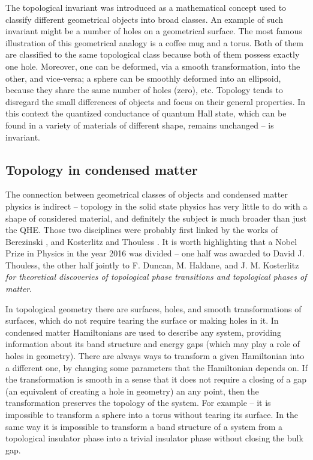 \documentclass[titlepage,a4paper]{book}
\newcommand{\wciecie}{\quad\phantom{v}}
\begin{document}
The topological invariant was introduced as a mathematical concept used to classify different geometrical objects into broad classes. An example of such invariant might be a number of holes on a geometrical surface. The most famous illustration of this geometrical analogy is a coffee mug and a torus. Both of them are classified to the same topological class because both of them possess exactly one hole. Moreover, one can be deformed, via a smooth transformation, into the other, and vice-versa; a sphere can be smoothly deformed into an ellipsoid, because they share the same number of holes (zero), etc. Topology tends to disregard the small differences of objects and focus on their general properties. In this context the quantized conductance of quantum Hall state, which can be found in a variety of materials of different shape, remains unchanged -- is invariant. 
 
\subsection{Topology in condensed matter}
\wciecie
The connection between geometrical classes of objects and condensed matter physics is indirect -- topology in the solid state physics has very little to do with a shape of considered material, and definitely the subject is much broader than just the QHE. Those two disciplines were probably first linked by the works of Berezinski \cite{Berezinski1}\cite{Berezinski2}, and Kosterlitz and Thouless \cite{Thouless_nobel}. It is worth highlighting that a Nobel Prize in Physics in the year 2016 was divided -- one half was awarded to David J. Thouless, the other half jointly to F. Duncan, M. Haldane, and J. M. Kosterlitz \textit{for theoretical discoveries of topological phase transitions and topological phases of matter}.

In topological geometry there are surfaces, holes, and smooth transformations of surfaces, which do not require tearing the surface or making holes in it. In condensed matter Hamiltonians are used to describe any system, providing information about its band structure and energy gaps (which may play a role of holes in geometry). There are always ways to transform a given Hamiltonian into a different one, by changing some parameters that the Hamiltonian depends on. If the transformation is smooth in a sense that it does not require a closing of a gap (an equivalent of creating a hole in geometry) an any point, then the transformation preserves the topology of the system. For example -- it is impossible to transform a sphere into a torus without tearing its surface. In the same way it is impossible to transform a band structure of a system from a topological insulator phase into a trivial insulator phase without closing the bulk gap. 
\end{document}
